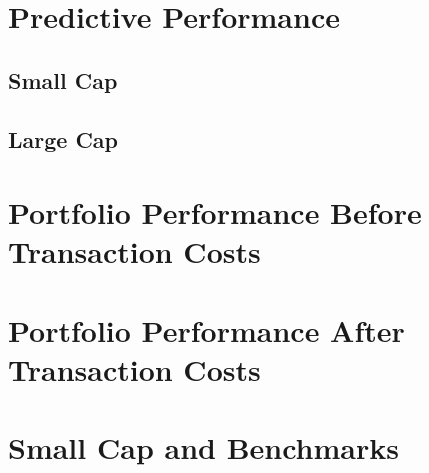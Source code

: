 \section{Predictive Performance}
\subsection{Small Cap}
\subsection{Large Cap}

\section{Portfolio Performance Before Transaction Costs}

\section{Portfolio Performance After Transaction Costs}

\section{Small Cap and Benchmarks}



